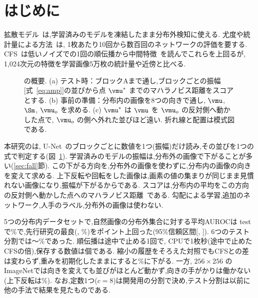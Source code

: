 \section{はじめに}
拡散モデル~\cite{song2021score,karras2022edm}は,学習済みのモデルを凍結したまま分布外検知に使える. 尤度や統計量による方法~\cite{serra2020input,mahmood2021msma,heng2024diffpath,alexis2026gepc,shoushtari2026eigenscore}は, 1枚あたり10回から数百回のネットワークの評価を要する. CFS~\cite{rouzoumka2026cfs}は低いノイズでの1回の順伝播から中間特徴~\cite{xiang2023ddae}を読んでこれらを上回るが, 1{,}024次元の特徴を学習画像5万枚の統計量や近傍と比べる.

\begin{figure}[t]\centering
\begin{adjustbox}{max width=\textwidth}\end{adjustbox}
\caption{\Ours{}の概要. (a) テスト時：ブロックAまで通し,ブロックごとの振幅[式~\eqref{eq:amp}]の並びから点 $\vmu^{*}$ までのマハラノビス距離をスコアとする. (b) 事前の準備：分布内の画像を8つの向きで通し, $\vmu$, $\Sm$, $\vmu_{o}$ を求める. (c) $\vmu^{*}$ は $\vmu$ を $\vmu_{o}$ の反対側へ動かした点で, $\vmu_{o}$ の側へ外れた並びほど遠い. 折れ線と配置は模式図である.}
\label{fig:method}
\end{figure}

本研究の\Ours{}は, U-Net~\cite{ronneberger2015unet}のブロックごとに数値を1つ(振幅)だけ読み,その並びを1つの式で判定する(図~\ref{fig:method}). 学習済みのモデルの振幅は,分布外の画像で下がることが多い(\ref{sec:fall}節). この下がる方向を,分布外の画像を使わずに,分布内の画像の向きを変えて求める. 上下反転や回転をした画像は,画素の値の集まりが同じまま見慣れない画像になり,振幅が下がるからである. スコアは,分布内の平均をこの方向の反対側へ動かした点へのマハラノビス距離~\cite{lee2018mahalanobis}である. 勾配による学習,追加のネットワーク,人手のラベル,分布外の画像は使わない.

5つの分布内データセットで,自然画像の分布外集合に対する平均AUROCは test で\olTestOL\%で,先行研究の最良(\olBestPriorName, \olBestPriorMean\%)を\olGapCfsKnn{}ポイント上回った(95\%信頼区間[\olGapCfsKnnLo, \olGapCfsKnnHi]). 6つのテスト分割では\olSixMin{}〜\olSixMax\%であった. 順伝播は途中で止める1回で, CPUで1枚\olSecOL{}秒(途中で止めたCFSの\olSecRatioCfsKnn{}倍),保存する数値は\olNStored{}個である. 縮小の履歴をそろえた対照でもCFSとの差は変わらず,重みを初期化したままにすると\olVarRinit\%に下がる. 一方, $256{\times}256$ のImageNetでは向きを変えても並びがほとんど動かず,向きの手がかりは働かない(上下反転は\olHrOLVf\%). なお,定数1つ($c=8$)は開発用の分割で決め,テスト分割は以前に他の手法で結果を見たものである.

